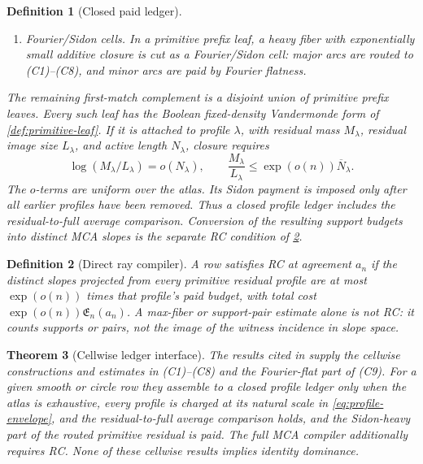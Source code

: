 \documentclass[11pt,a4paper]{amsart}
\numberwithin{equation}{section}
\newtheorem{theorem}{Theorem}[section]
\newtheorem{definition}[theorem]{Definition}
\theoremstyle{remark}
\newcommand{\barN}{\overline N}
\newcommand{\Eprof}{\mathfrak E}
\begin{document}
\begin{definition}[Closed paid ledger]
\begin{enumerate}[label=\textup{(C\arabic*)},leftmargin=2.7em]
    \item \emph{Fourier/Sidon cells.}  In a primitive prefix leaf, a heavy fiber with exponentially small additive closure is cut as a Fourier/Sidon cell: major arcs are routed to \textup{(C1)--(C8)}, and minor arcs are paid by Fourier flatness.
\end{enumerate}
The remaining first-match complement is a disjoint union of primitive
prefix leaves.  Every such leaf has the Boolean fixed-density Vandermonde
form of \cref{def:primitive-leaf}.  If it is attached to profile
\(\lambda\), with residual mass \(M_\lambda\), residual image size
\(L_\lambda\), and active length \(N_\lambda\), closure requires
\[
 \log(M_\lambda/L_\lambda)=o(N_\lambda),\qquad
 \frac{M_\lambda}{L_\lambda}
 \le\exp(o(n))\barN_\lambda.
\]
The \(o\)-terms are uniform over the atlas.  Its Sidon payment is imposed
only after all earlier profiles have been
removed.  Thus a closed profile ledger includes the residual-to-full
average comparison.  Conversion of the resulting support budgets into
distinct MCA slopes is the separate RC condition of
\cref{def:ray-compiler}.
\end{definition}

\begin{definition}[Direct ray compiler]\label{def:ray-compiler}
A row satisfies \emph{RC} at agreement \(a_n\) if the distinct slopes
projected from every primitive residual profile are at most
\(\exp(o(n))\) times that profile's paid budget, with total cost
\(\exp(o(n))\Eprof_n(a_n)\).  A max-fiber or support-pair estimate alone
is not RC: it counts supports or pairs, not the image of the witness
incidence in slope space.
\end{definition}

\begin{theorem}[Cellwise ledger interface]\label{thm:closed-ledger-package}
The results cited in \cite{Cho26CapV13,Cho26Grande} supply the cellwise
constructions and estimates in \textup{(C1)--(C8)} and the Fourier-flat
part of \textup{(C9)}.  For a given smooth or circle row they assemble to
a closed profile ledger only when the atlas is exhaustive, every profile is
charged at its natural scale in \eqref{eq:profile-envelope}, and the
residual-to-full average comparison holds, and the Sidon-heavy part of the
routed primitive residual is paid.  The full MCA compiler additionally
requires RC.  None of these cellwise results implies identity dominance.
\end{theorem}
\end{document}

